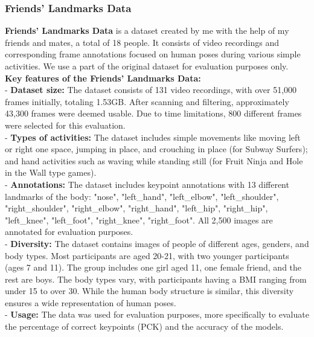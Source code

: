 \documentclass[12pt]{article}
\begin{document}
\subsubsection{Friends' Landmarks Data}
\textbf{Friends' Landmarks Data} is a dataset created by me with the help of my friends and mates, a total of 18 people. It consists of video recordings and corresponding frame annotations focused on human poses during various simple activities. We use a part of the original dataset for evaluation purposes only.\\

\textbf{Key features of the Friends' Landmarks Data:}\\[5pt]
\hspace*{1.5em}- \textbf{Dataset size:} The dataset consists of 131 video recordings, with over 51,000 frames initially, totaling 1.53GB. After scanning and filtering, approximately 43,300 frames were deemed usable. Due to time limitations, 800 different frames were selected for this evaluation.\\[5pt]
\hspace*{1.5em}- \textbf{Types of activities:} The dataset includes simple movements like moving left or right one space, jumping in place, and crouching in place (for Subway Surfers); and hand activities such as waving while standing still (for Fruit Ninja and Hole in the Wall type games).\\[5pt]
\hspace*{1.5em}- \textbf{Annotations:} The dataset includes keypoint annotations with 13 different landmarks of the body: "nose", "left\_hand", "left\_elbow", "left\_shoulder", "right\_shoulder", "right\_elbow", "right\_hand", "left\_hip", "right\_hip", "left\_knee", "left\_foot", "right\_knee", "right\_foot". All 2,500 images are annotated for evaluation purposes.\\[5pt]
\hspace*{1.5em}- \textbf{Diversity:} The dataset contains images of people of different ages, genders, and body types. Most participants are aged 20-21, with two younger participants (ages 7 and 11). The group includes one girl aged 11, one female friend, and the rest are boys. The body types vary, with participants having a BMI ranging from under 15 to over 30. While the human body structure is similar, this diversity ensures a wide representation of human poses.\\[5pt]
\hspace*{1.5em}- \textbf{Usage:} The data was used for evaluation purposes, more specifically to evaluate the percentage of correct keypoints (PCK) and the accuracy of the models.\\
\end{document}
